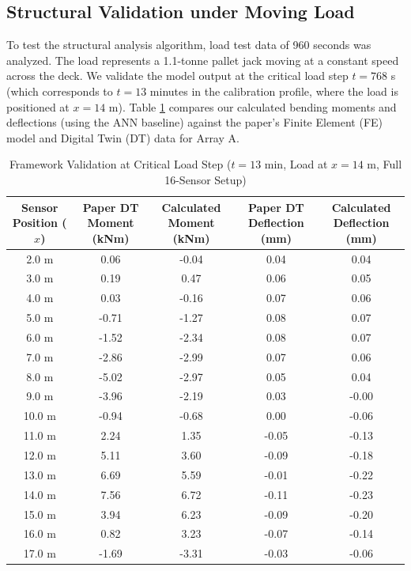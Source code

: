 \documentclass[11pt,journal,onecolumn]{IEEEtran}
\begin{document}
\subsection{Structural Validation under Moving Load}
To test the structural analysis algorithm, load test data of 960 seconds was analyzed. The load represents a 1.1-tonne pallet jack moving at a constant speed across the deck. 
We validate the model output at the critical load step $t = 768$ s (which corresponds to $t = 13$ minutes in the calibration profile, where the load is positioned at $x = 14$ m). Table \ref{tab:structural_validation} compares our calculated bending moments and deflections (using the ANN baseline) against the paper's Finite Element (FE) model and Digital Twin (DT) data for Array A.

\begin{table}[htbp]
\centering
\caption{Framework Validation at Critical Load Step ($t = 13$ min, Load at $x = 14$ m, Full 16-Sensor Setup)}
\label{tab:structural_validation}
\begin{tabular}{ccccc}
\toprule
\textbf{Sensor Position ($x$)} & \textbf{Paper DT Moment (kNm)} & \textbf{Calculated Moment (kNm)} & \textbf{Paper DT Deflection (mm)} & \textbf{Calculated Deflection (mm)} \\
\midrule
2.0 m  & 0.06  & -0.04 & 0.04  & 0.04 \\
3.0 m  & 0.19  & 0.47  & 0.06  & 0.05 \\
4.0 m  & 0.03  & -0.16 & 0.07  & 0.06 \\
5.0 m  & -0.71 & -1.27 & 0.08  & 0.07 \\
6.0 m  & -1.52 & -2.34 & 0.08  & 0.07 \\
7.0 m  & -2.86 & -2.99 & 0.07  & 0.06 \\
8.0 m  & -5.02 & -2.97 & 0.05  & 0.04 \\
9.0 m  & -3.96 & -2.19 & 0.03  & -0.00 \\
10.0 m & -0.94 & -0.68 & 0.00  & -0.06 \\
11.0 m & 2.24  & 1.35  & -0.05 & -0.13 \\
12.0 m & 5.11  & 3.60  & -0.09 & -0.18 \\
13.0 m & 6.69  & 5.59  & -0.01 & -0.22 \\
14.0 m & 7.56  & 6.72  & -0.11 & -0.23 \\
15.0 m & 3.94  & 6.23  & -0.09 & -0.20 \\
16.0 m & 0.82  & 3.23  & -0.07 & -0.14 \\
17.0 m & -1.69 & -3.31 & -0.03 & -0.06 \\
\bottomrule
\end{tabular}
\end{table}
\end{document}
